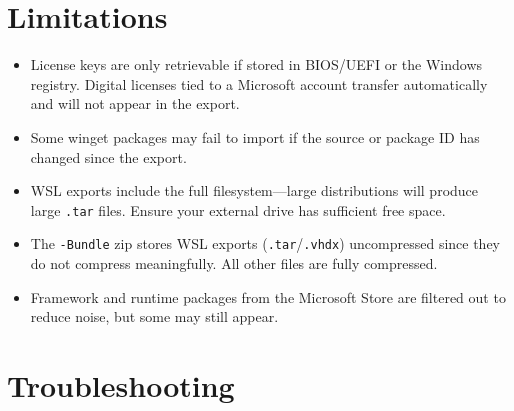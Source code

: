 \documentclass[11pt,a4paper]{article}
\begin{document}
\section{Limitations}

\begin{itemize}
    \item License keys are only retrievable if stored in BIOS/UEFI or the Windows registry. Digital licenses tied to a Microsoft account transfer automatically and will not appear in the export.
    \item Some winget packages may fail to import if the source or package ID has changed since the export.
    \item WSL exports include the full filesystem---large distributions will produce large \texttt{.tar} files. Ensure your external drive has sufficient free space.
    \item The \texttt{-Bundle} zip stores WSL exports (\texttt{.tar}/\texttt{.vhdx}) uncompressed since they do not compress meaningfully. All other files are fully compressed.
    \item Framework and runtime packages from the Microsoft Store are filtered out to reduce noise, but some may still appear.
\end{itemize}

\section{Troubleshooting}
\end{document}
